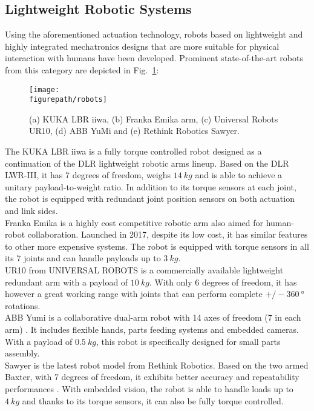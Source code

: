 \subsection{Lightweight Robotic Systems}  
Using the aforementioned actuation technology, robots based on lightweight and highly integrated mechatronics designs that are more suitable for physical interaction with humans have been developed. Prominent state-of-the-art robots from this category are depicted in Fig.~\ref{fig:robots}: 
\begin{figure}[!ht]
\centering
\texttt{[image: \\figurepath/robots]}
\caption{(a) KUKA LBR iiwa, (b) Franka Emika arm, (c) Universal Robots UR10, (d) ABB YuMi and (e) Rethink Robotics Sawyer.}
\label{fig:robots}
\end{figure} 
The KUKA LBR iiwa \cite{iiwa-url} is a fully torque controlled robot designed as a continuation of the DLR lightweight robotic arms lineup. Based on the DLR LWR-III, it has 7 degrees of freedom, weighs $14~kg$ and is able to achieve a unitary payload-to-weight ratio. In addition to its torque sensors at each joint, the robot is equipped with redundant joint position sensors on both actuation and link sides. \\
%
Franka Emika \cite{Franka-url} is a highly cost competitive robotic arm also aimed for human-robot collaboration. Launched in 2017, despite its low cost, it has similar features to other more expensive systems. The robot is equipped with torque sensors in all its 7 joints and can handle payloads up to $3~kg$. \\
%
UR10 from UNIVERSAL ROBOTS \cite{UR10-url} is a commercially available lightweight redundant arm with a payload of $10~kg$. With only 6 degrees of freedom, it has however a great working range with joints that can perform  complete $+/-360~°$ rotations. \\
%
ABB Yumi is a collaborative dual-arm robot with 14 axes of freedom (7 in each arm) \cite{YuMi-url}. It includes flexible hands, parts feeding systems and embedded cameras. With a payload of $0.5~kg$, this robot is specifically designed for small parts assembly. \\
%
Sawyer is the latest robot model from Rethink Robotics. Based on the two armed Baxter, with 7 degrees of freedom, it exhibits better accuracy and repeatability performances \cite{Sawyer-url}. With embedded vision, the robot is able to handle loads up to $4~kg$ and thanks to its torque sensors, it can also be fully torque controlled. 

